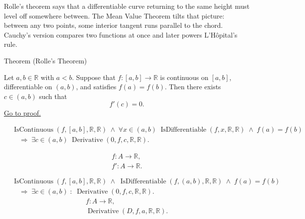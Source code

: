 
\begin{remark*}[Interpretation]
Rolle's theorem says that a differentiable curve returning to the same height
must level off somewhere between. The Mean Value Theorem tilts that picture:
between any two points, some interior tangent runs parallel to the chord.
Cauchy's version compares two functions at once and later powers
L'H\^{o}pital's rule.
\end{remark*}



\begin{theorembox}{Theorem (Rolle's Theorem)}
\begin{theorem}
\label{thm:rolles-theorem}
Let $a, b \in \mathbb{R}$ with $a < b$. Suppose that $f : [a,b] \to \mathbb{R}$ is continuous on $[a,b]$, differentiable on $(a,b)$, and satisfies $f(a) = f(b)$. Then there exists $c \in (a,b)$ such that
\[
f'(c) = 0.
\]
\hyperref[prf:rolles-theorem]{Go to proof.}
\end{theorem}
\end{theorembox}

\begin{remark*}
\begin{align*}
&\operatorname{IsContinuous}(f,[a,b],\mathbb{R},\mathbb{R})
\;\land\;
\forall x \in (a,b)\;\operatorname{IsDifferentiable}(f,x,\mathbb{R},\mathbb{R})
\;\land\;
f(a)=f(b)\\
&\quad\Rightarrow\;
\exists c \in (a,b)\;\operatorname{Derivative}(0,f,c,\mathbb{R},\mathbb{R}).
\end{align*}
\end{remark*}

\begin{remark*}
\[
\begin{aligned}
  f\colon A\to\mathbb{R},\\
  f'\colon A\to\mathbb{R}.
\end{aligned}
\]

\begin{align*}
&\operatorname{IsContinuous}(f,[a,b],\mathbb{R},\mathbb{R})
\;\land\;
\operatorname{IsDifferentiable}(f,(a,b),\mathbb{R},\mathbb{R})
\;\land\;
f(a)=f(b)\\
&\quad\Longrightarrow\;
\exists c\in(a,b)\;:\;\operatorname{Derivative}(0,f,c,\mathbb{R},\mathbb{R}).
\end{align*}
\[
\begin{aligned}
  f\colon A\to\mathbb{R},\\
  \operatorname{Derivative}(D,f,a,\mathbb{R},\mathbb{R}).
\end{aligned}
\]
\end{remark*}

